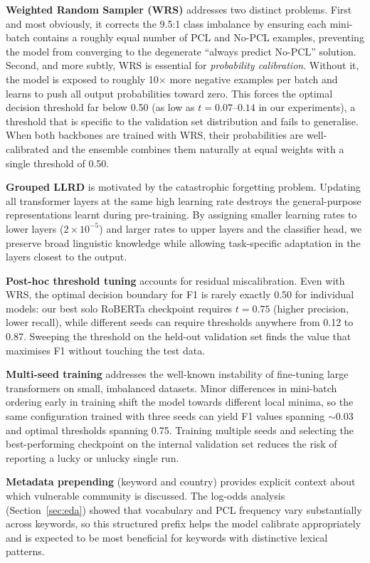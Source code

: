 \documentclass[11pt]{article}
\begin{document}
\textbf{Weighted Random Sampler (WRS)} addresses two distinct problems. First and most obviously, it corrects the 9.5:1 class imbalance by ensuring each mini-batch contains a roughly equal number of PCL and No-PCL examples, preventing the model from converging to the degenerate ``always predict No-PCL'' solution. Second, and more subtly, WRS is essential for \emph{probability calibration}. Without it, the model is exposed to roughly 10$\times$ more negative examples per batch and learns to push all output probabilities toward zero. This forces the optimal decision threshold far below 0.50 (as low as $t=0.07$--$0.14$ in our experiments), a threshold that is specific to the validation set distribution and fails to generalise. When both backbones are trained with WRS, their probabilities are well-calibrated and the ensemble combines them naturally at equal weights with a single threshold of 0.50.

\textbf{Grouped LLRD} is motivated by the catastrophic forgetting problem. Updating all transformer layers at the same high learning rate destroys the general-purpose representations learnt during pre-training. By assigning smaller learning rates to lower layers ($2 \times 10^{-5}$) and larger rates to upper layers and the classifier head, we preserve broad linguistic knowledge while allowing task-specific adaptation in the layers closest to the output.

\textbf{Post-hoc threshold tuning} accounts for residual miscalibration. Even with WRS, the optimal decision boundary for F1 is rarely exactly 0.50 for individual models: our best solo RoBERTa checkpoint requires $t=0.75$ (higher precision, lower recall), while different seeds can require thresholds anywhere from 0.12 to 0.87. Sweeping the threshold on the held-out validation set finds the value that maximises F1 without touching the test data.

\textbf{Multi-seed training} addresses the well-known instability of fine-tuning large transformers on small, imbalanced datasets. Minor differences in mini-batch ordering early in training shift the model towards different local minima, so the same configuration trained with three seeds can yield F1 values spanning $\sim$0.03 and optimal thresholds spanning 0.75. Training multiple seeds and selecting the best-performing checkpoint on the internal validation set reduces the risk of reporting a lucky or unlucky single run.

\textbf{Metadata prepending} (keyword and country) provides explicit context about which vulnerable community is discussed. The log-odds analysis (Section~\ref{sec:eda}) showed that vocabulary and PCL frequency vary substantially across keywords, so this structured prefix helps the model calibrate appropriately and is expected to be most beneficial for keywords with distinctive lexical patterns.
\end{document}
